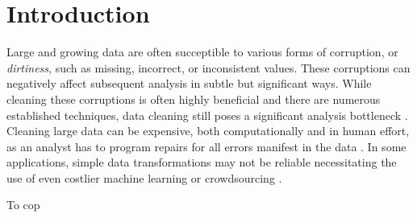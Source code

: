 \section{Introduction}
Large and growing data are often succeptible to various forms of corruption, or \emph{dirtiness}, such as missing, incorrect, or inconsistent values.
These corruptions can negatively affect subsequent analysis in subtle but significant ways.
While cleaning these corruptions is often highly beneficial and there are numerous established techniques, data cleaning still poses a significant analysis bottleneck \cite{khayyat2015bigdansing,sampleclean, chu2015katara}.
Cleaning large data can be expensive, both computationally and in human effort, as an analyst has to program repairs for all errors manifest in the data \cite{kandel2012}.
In some applications, simple data transformations may not be reliable necessitating the use of even costlier machine learning or crowdsourcing \cite{gokhale2014corleone,park2014crowdfill}.

To cop
